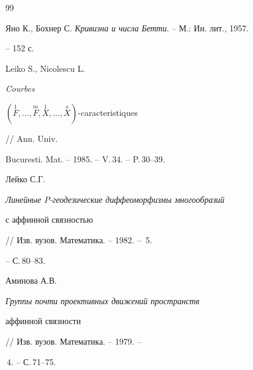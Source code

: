 \begin{thebibliography}{99}


Яно К., Бохнер С. {\em Кривизна и числа Бетти}. -- М.: Ин. лит., 1957.


-- 152 с.




Leiko S., Nicolescu L. {\em Courbes


$(\overset{1}{F}{},\dotsc,\overset{m}{F}{},


\overset{1}{X},\dotsc,\overset{s}{X}{})$-caracteristiques} // Ann. Univ.


Bucuresti. Mat. -- 1985. -- V.\,34. -- P.\,30--39.




Лейко С.Г. {\em Линейные $P$-геодезические диффеоморфизмы многообразий


с аффинной связностью} // Изв. вузов. Математика. -- 1982. -- \No\,5.


-- С.\,80--83.




Аминова А.В. {\em Группы почти проективных движений пространств


аффинной связности} // Изв. вузов. Математика. -- 1979. --


\No\,4. -- С.\,71--75.





\end{thebibliography}





\vskip 2cm














\label{end}





